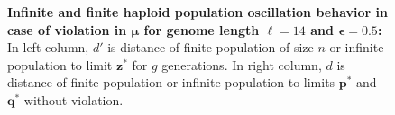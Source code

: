 \begin{figure}[h]
\begin{center}
\hspace{-3em}%
\vspace{-0.5em} \hspace{-3em}%

\caption{\textbf{Infinite and finite haploid population oscillation behavior in case of violation in $\bm{\mu}$ for genome length $\ell = 14$ and $\bm{\epsilon} = 0.5$:} 
  In left column, $d'$ is distance of finite population of size $n$ or infinite population to limit $\bm{z}^\ast$ for $g$ generations. In right column, $d$ is distance of finite population or infinite population to limits $\bm{p}^\ast$ and $\bm{q}^\ast$ without violation.}
\label{oscillation_14h_vio_mu_0.5}
\end{center}
\end{figure}


